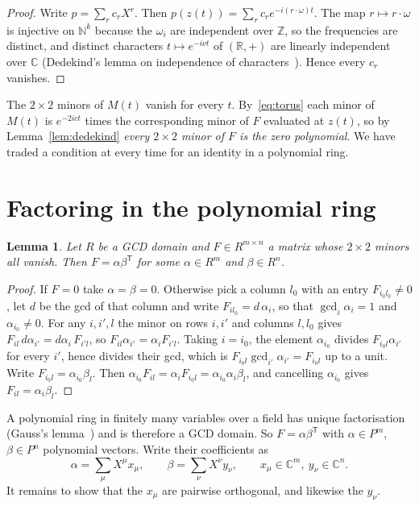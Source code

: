 \documentclass[11pt]{article}
\newtheorem{lemma}[theorem]{Lemma}
\theoremstyle{remark}
\newcommand{\C}{\mathbb{C}}
\newcommand{\R}{\mathbb{R}}
\newcommand{\Z}{\mathbb{Z}}
\newcommand{\N}{\mathbb{N}}
\begin{document}
\begin{proof}
Write $p=\sum_r c_rX^r$. Then $p(z(t))=\sum_r c_r e^{-i(r\cdot\omega)t}$. The map $r\mapsto
r\cdot\omega$ is injective on $\N^k$ because the $\omega_i$ are independent over $\Z$, so the
frequencies are distinct, and distinct characters $t\mapsto e^{-i\nu t}$ of $(\R,+)$ are
linearly independent over $\C$ (Dedekind's lemma on independence of characters~\cite{Lang}). Hence every $c_r$
vanishes.
\end{proof}

The $2\times2$ minors of $M(t)$ vanish for every $t$. By~\eqref{eq:torus} each minor of $M(t)$
is $e^{-2ict}$ times the corresponding minor of $F$ evaluated at $z(t)$, so by
Lemma~\ref{lem:dedekind} \emph{every $2\times2$ minor of $F$ is the zero polynomial}. We have
traded a condition at every time for an identity in a polynomial ring.

\section{Factoring in the polynomial ring}

\begin{lemma}\label{lem:rankone}
Let $R$ be a GCD domain and $F\in R^{m\times n}$ a matrix whose $2\times2$ minors all vanish.
Then $F=\alpha\beta^{\mathsf T}$ for some $\alpha\in R^m$ and $\beta\in R^n$.
\end{lemma}

\begin{proof}
If $F=0$ take $\alpha=\beta=0$. Otherwise pick a column $l_0$ with an entry $F_{i_0l_0}\ne0$,
let $d$ be the gcd of that column and write $F_{il_0}=d\,\alpha_i$, so that $\gcd_i\alpha_i=1$
and $\alpha_{i_0}\ne0$. For any $i,i',l$ the minor on rows $i,i'$ and columns $l,l_0$ gives
$F_{il}\,d\alpha_{i'}=d\alpha_i\,F_{i'l}$, so $F_{il}\alpha_{i'}=\alpha_iF_{i'l}$. Taking
$i=i_0$, the element $\alpha_{i_0}$ divides $F_{i_0l}\alpha_{i'}$ for every $i'$, hence divides
their gcd, which is $F_{i_0l}\gcd_{i'}\alpha_{i'}=F_{i_0l}$ up to a unit. Write
$F_{i_0l}=\alpha_{i_0}\beta_l$. Then $\alpha_{i_0}F_{il}=\alpha_iF_{i_0l}=\alpha_{i_0}
\alpha_i\beta_l$, and cancelling $\alpha_{i_0}$ gives $F_{il}=\alpha_i\beta_l$.
\end{proof}

A polynomial ring in finitely many variables over a field has unique factorisation
(Gauss's lemma~\cite{Lang}) and is therefore a GCD domain. So $F=\alpha\beta^{\mathsf T}$
with $\alpha\in P^m$, $\beta\in P^n$ polynomial vectors. Write their coefficients as
\[
\alpha=\sum_\mu X^\mu x_\mu,\qquad \beta=\sum_\nu X^\nu y_\nu,\qquad x_\mu\in\C^m,\ y_\nu\in
\C^n .
\]
It remains to show that the $x_\mu$ are pairwise orthogonal, and likewise the $y_\nu$.
\end{document}
